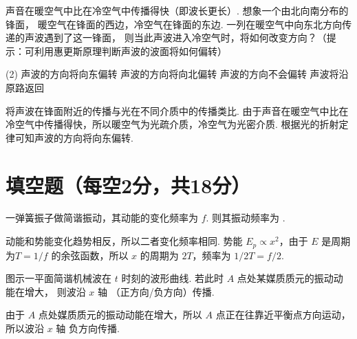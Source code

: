 \begin{textfig}
  \begin{problem}
    声音在暖空气中比在冷空气中传播得快（即波长更长）. 想象一个由北向南分布的锋面，
    暖空气在锋面的西边，冷空气在锋面的东边. 一列在暖空气中向东北方向传递的声波遇到了这一锋面，
    则当此声波进入冷空气时，将如何改变方向？（提示：可利用惠更斯原理判断声波的波面将如何偏转）
    \begin{tasks}(2)
      \task[\true] 声波的方向将向东偏转
      \task 声波的方向将向北偏转
      \task 声波的方向不会偏转
      \task 声波将沿原路返回
    \end{tasks}
  \end{problem}
  \textfigsplit\centering
\end{textfig}
\scratch
\begin{solution}
  将声波在锋面附近的传播与光在不同介质中的传播类比.
  由于声音在暖空气中比在冷空气中传播得快，所以暖空气为光疏介质，冷空气为光密介质.
  根据光的折射定律可知声波的方向将向东偏转.
\end{solution}
  
\section{填空题（每空2分，共18分）}

\begin{problem}
  一弹簧振子做简谐振动，其动能的变化频率为 $f$. 则其振动频率为 .
\end{problem}
\scratch
\begin{solution}
  动能和势能变化趋势相反，所以二者变化频率相同. 势能 $E_p\propto x^2$，由于 $E$ 是周期为$T = 1/f$ 的余弦函数，所以 $x$ 的周期为 $2T$，频率为 $1/2T = f/2$.
\end{solution}

\begin{textfig}
  \begin{problem}
    图示一平面简谐机械波在 $t$ 时刻的波形曲线. 若此时 $A$ 点处某媒质质元的振动动能在增大，
    则波沿 $x$ 轴  （正方向/负方向）传播.
  \end{problem}
  \scratch
\begin{solution}
    由于 $A$ 点处媒质质元的振动动能在增大，所以 $A$ 点正在往靠近平衡点方向运动，
    所以波沿 $x$ 轴 负方向传播.
\end{solution}
  \textfigsplit\centering
\end{textfig}

